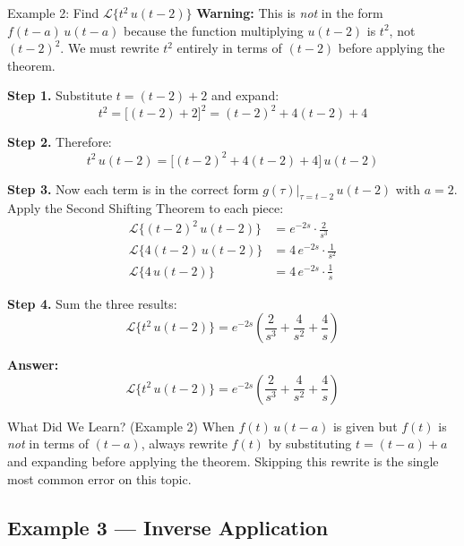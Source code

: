 \documentclass[12pt,a4paper]{article}
\begin{document}
\begin{infobox}{Example 2: Find $\mathcal{L}\{t^2\,u(t-2)\}$}
\textbf{Warning:} This is \emph{not} in the form $f(t-a)\,u(t-a)$ because the function
multiplying $u(t-2)$ is $t^2$, not $(t-2)^2$.
We must rewrite $t^2$ entirely in terms of $(t-2)$ before applying the theorem.

\textbf{Step 1.} Substitute $t = (t-2) + 2$ and expand:
\[
  t^2 = \bigl[(t-2) + 2\bigr]^2
  = (t-2)^2 + 4(t-2) + 4
\]

\textbf{Step 2.} Therefore:
\[
  t^2\,u(t-2) = \bigl[(t-2)^2 + 4(t-2) + 4\bigr]\,u(t-2)
\]

\textbf{Step 3.} Now each term is in the correct form $g(\tau)\big|_{\tau=t-2}\,u(t-2)$
with $a = 2$.
Apply the Second Shifting Theorem to each piece:
\begin{align*}
  \mathcal{L}\{(t-2)^2\,u(t-2)\} &= e^{-2s}\cdot\frac{2}{s^3} \\[4pt]
  \mathcal{L}\{4(t-2)\,u(t-2)\}  &= 4\,e^{-2s}\cdot\frac{1}{s^2} \\[4pt]
  \mathcal{L}\{4\,u(t-2)\}        &= 4\,e^{-2s}\cdot\frac{1}{s}
\end{align*}

\textbf{Step 4.} Sum the three results:
\[
  \mathcal{L}\{t^2\,u(t-2)\} = e^{-2s}\!\left(\frac{2}{s^3} + \frac{4}{s^2} + \frac{4}{s}\right)
\]

\textbf{Answer:}
\[
  \boxed{\mathcal{L}\{t^2\,u(t-2)\} = e^{-2s}\!\left(\frac{2}{s^3} + \frac{4}{s^2} + \frac{4}{s}\right)}
\]
\end{infobox}

\begin{learnbox}{What Did We Learn? (Example 2)}
When $f(t)\,u(t-a)$ is given but $f(t)$ is \emph{not} in terms of $(t-a)$, always rewrite
$f(t)$ by substituting $t = (t-a) + a$ and expanding before applying the theorem.
Skipping this rewrite is the single most common error on this topic.
\end{learnbox}

\subsection*{Example 3 --- Inverse Application}
\end{document}
